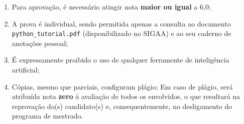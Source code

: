 \documentclass{../class/IFSCprova}
\newcommand{\0}{_{_{\! n\!}}}
\newcommand{\1}{_{_{\! n\text{-}\!\>\!1\!}}}
\newcommand{\2}{_{_{\! n-\!2\!}}}
\begin{document}
{\begin{enumerate}[label=\roman*)]
        Portanto, atente-se à implementação correta das funções e scripts, bem como à nomenclatura dos arquivos, nomes das funções, variáveis de retorno e argumentos, conforme indicado em cada questão;
        \item   Para aprovação, é necessário atingir nota \textbf{maior ou igual} a 6,0;
        \item   A prova é individual, sendo permitida apenas a consulta ao documento \texttt{python\_tutorial.pdf} (disponibilizado no SIGAA) e ao seu caderno de anotações pessoal;
        \item   É expressamente proibido o uso de qualquer ferramente de inteligência artificial;
        \item   Cópias, mesmo que parciais, configuram plágio;
        Em caso de plágio, será atribuída nota \textbf{zero} à avaliação de todos os envolvidos, o que resultará na reprovação do(s) candidato(s) e, consequentemente, no desligamento do programa de mestrado.
    \end{enumerate}
}

    \vspace{2mm}

    \newpage

    
    
    
    
\end{document}
